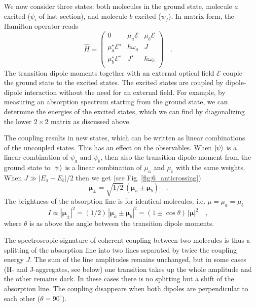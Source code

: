 We now consider three states: both molecules in the ground state, molecule $a$ excited ($\psi_i$ of last section), and molecule $b$ excited ($\psi_f$). In matrix form, the Hamilton operator reads 
\begin{equation}
\hat{H} = \begin{pmatrix}
0 & \mu_a \mathcal{E}& \mu_b \mathcal{E} \\
\mu_a^\star \mathcal{E}^\star & \hbar \omega_a & J  \\
\mu_b^\star \mathcal{E}^\star & J^\star & \hbar \omega_b \\
\end{pmatrix} \quad .
\end{equation}
The transition dipole moments together with an external optical field $\mathcal{E}$ couple the ground state to the excited states. The excited states are coupled by dipole-dipole interaction without the need for an external field. For example, by measuring an absorption spectrum starting from the ground state, we can determine the energies of the excited states, which we can find by diagonalizing the lower $2 \times 2$ matrix as discussed above.

The coupling results in new states, which can be written as linear combinations of the uncoupled states. This has an effect on the observables. When $\ket{\psi}$ is a linear combination of $\psi_a$ and $\psi_b$, then also the transition dipole moment from  the ground state to $\ket{\psi}$ is a linear combination of $\mu_a$ and $\mu_b$ with the same weights. When $J \gg |E_a - E_b| / 2$ then we get (see Fig. \ref{fig:6_anticrossing})
\begin{equation}
 \boldsymbol{\mu}_{\pm} = \sqrt{1/2} \, \left( \boldsymbol{\mu}_a \pm \boldsymbol{\mu}_b \right) \quad .
\end{equation}
The brightness of the absorption line is for identical molecules, i.e. $\mu = \mu_a = \mu_b$
\begin{equation}
 I \propto |\boldsymbol{\mu}_{\pm}|^2 = (1/2) \, \left| \boldsymbol{\mu}_a \pm \boldsymbol{\mu}_b \right|^2 = \left( 1 \pm \cos \theta \right) \, \left| \boldsymbol{\mu}   \right| ^2 \quad ,
\end{equation}
where $\theta$ is as above the angle between the transition dipole moments.  

The spectroscopic signature of coherent coupling between two molecules is thus a splitting of the absorption line into two lines separated by twice the coupling energy $J$. The sum of the line amplitudes remains unchanged, but in some cases (H- and J-aggregates, see below) one transition takes up the whole amplitude and the other remains dark. In these cases there is no splitting but a shift of the absorption line. The coupling disappears when both dipoles are perpendicular to each other ($\theta = 90^\circ$).

